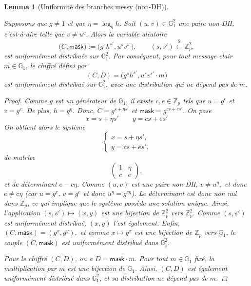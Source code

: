 \documentclass[10pt,a4paper]{article}
\theoremstyle{definition}
\theoremstyle{plain}
\newtheorem{lemma}[definition]{Lemma}
\theoremstyle{remark}
\newcommand{\sample}{\xleftarrow{\$}}
\begin{document}
\begin{lemma}[Uniformité des branches messy (non-DH)]\label{lem:lossy}
    
Supposons que $g\neq 1$ et que $\eta=\log_g h$. Soit
$(u,v)\in\mathbb{G}_1^2$ une paire non-DH, c'est-à-dire telle que
$v\neq u^{\eta}$. Alors la variable aléatoire
\[
\bigl(C,\mathsf{mask}\bigr)
:=
\bigl(g^{s}h^{s'},u^{s}v^{s'}\bigr),
\qquad
(s,s')\sample\mathbb{Z}_p^2,
\]
est uniformément distribuée sur $\mathbb{G}_1^2$. Par conséquent, pour
tout message clair $m\in\mathbb{G}_1$, le chiffré défini par
\[
(C,D)
=
\bigl(g^{s}h^{s'},u^{s}v^{s'}\cdot m\bigr)
\]
est uniformément distribué sur $\mathbb{G}_1^2$, avec une distribution
qui ne dépend pas de $m$.

\begin{proof}

Comme $g$ est un générateur de $\mathbb{G}_1$, il existe
$c,e\in\mathbb{Z}_p$ tels que
$
u=g^c
$
et
$
v=g^e.
$
De plus, $h=g^\eta$. Donc,
$
C=g^{s+\eta s'}
$
et
$
\mathsf{mask}=g^{cs+es'}.
$
On pose
\[
x=s+\eta s'
\qquad
y=cs+es'
\]
On obtient alors le système
\[
\begin{cases}
x=s+\eta s',\\
y=cs+es'.
\end{cases}
\]
de matrice
\[
\begin{pmatrix}
1 & \eta\\
c & e
\end{pmatrix},
\]
et de déterminant
$
e-c\eta.
$
Comme $(u,v)$ est une paire non-DH,
$
v\neq u^\eta,
$
et donc $e\neq c\eta$ (car $u=g^c$, $v=g^e$ et donc $u^\eta=g^{c\eta}$).
Le déterminant est donc non nul dans
$\mathbb{Z}_p$, ce qui implique que le système possède une solution
unique.
Ainsi, l'application
$
(s,s')\mapsto(x,y)
$
est une bijection de $\mathbb{Z}_p^2$ vers $\mathbb{Z}_p^2$.
Comme $(s,s')$ est uniformément distribué, $(x,y)$ l'est également.
Enfin,
$
(C,\mathsf{mask})=(g^x,g^y),
$
et comme $x\mapsto g^x$ est une bijection de $\mathbb{Z}_p$ vers
$\mathbb{G}_1$, le couple $(C,\mathsf{mask})$ est uniformément
distribué dans $\mathbb{G}_1^2$.

Pour le chiffré $(C,D)$, on a
$
D=\mathsf{mask}\cdot m.
$
Pour tout $m\in\mathbb{G}_1$ fixé, la multiplication par $m$ est une
bijection de $\mathbb{G}_1$. Ainsi, $(C,D)$ est également uniformément
distribué dans $\mathbb{G}_1^2$, et sa distribution ne dépend pas de
$m$.

\end{proof}

\end{lemma}
\end{document}
